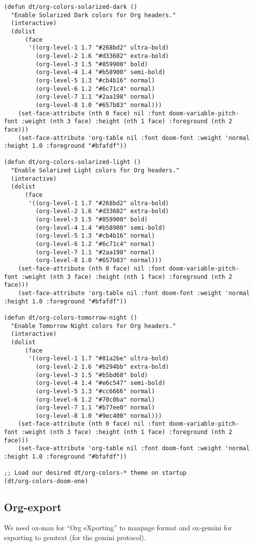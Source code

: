 \documentclass[11pt]{article}
\begin{document}
\begin{verbatim}
(defun dt/org-colors-solarized-dark ()
  "Enable Solarized Dark colors for Org headers."
  (interactive)
  (dolist
      (face
       '((org-level-1 1.7 "#268bd2" ultra-bold)
         (org-level-2 1.6 "#d33682" extra-bold)
         (org-level-3 1.5 "#859900" bold)
         (org-level-4 1.4 "#b58900" semi-bold)
         (org-level-5 1.3 "#cb4b16" normal)
         (org-level-6 1.2 "#6c71c4" normal)
         (org-level-7 1.1 "#2aa198" normal)
         (org-level-8 1.0 "#657b83" normal)))
    (set-face-attribute (nth 0 face) nil :font doom-variable-pitch-font :weight (nth 3 face) :height (nth 1 face) :foreground (nth 2 face)))
    (set-face-attribute 'org-table nil :font doom-font :weight 'normal :height 1.0 :foreground "#bfafdf"))

(defun dt/org-colors-solarized-light ()
  "Enable Solarized Light colors for Org headers."
  (interactive)
  (dolist
      (face
       '((org-level-1 1.7 "#268bd2" ultra-bold)
         (org-level-2 1.6 "#d33682" extra-bold)
         (org-level-3 1.5 "#859900" bold)
         (org-level-4 1.4 "#b58900" semi-bold)
         (org-level-5 1.3 "#cb4b16" normal)
         (org-level-6 1.2 "#6c71c4" normal)
         (org-level-7 1.1 "#2aa198" normal)
         (org-level-8 1.0 "#657b83" normal)))
    (set-face-attribute (nth 0 face) nil :font doom-variable-pitch-font :weight (nth 3 face) :height (nth 1 face) :foreground (nth 2 face)))
    (set-face-attribute 'org-table nil :font doom-font :weight 'normal :height 1.0 :foreground "#bfafdf"))

(defun dt/org-colors-tomorrow-night ()
  "Enable Tomorrow Night colors for Org headers."
  (interactive)
  (dolist
      (face
       '((org-level-1 1.7 "#81a2be" ultra-bold)
         (org-level-2 1.6 "#b294bb" extra-bold)
         (org-level-3 1.5 "#b5bd68" bold)
         (org-level-4 1.4 "#e6c547" semi-bold)
         (org-level-5 1.3 "#cc6666" normal)
         (org-level-6 1.2 "#70c0ba" normal)
         (org-level-7 1.1 "#b77ee0" normal)
         (org-level-8 1.0 "#9ec400" normal)))
    (set-face-attribute (nth 0 face) nil :font doom-variable-pitch-font :weight (nth 3 face) :height (nth 1 face) :foreground (nth 2 face)))
    (set-face-attribute 'org-table nil :font doom-font :weight 'normal :height 1.0 :foreground "#bfafdf"))

;; Load our desired dt/org-colors-* theme on startup
(dt/org-colors-doom-one)

\end{verbatim}

\subsection{Org-export}
\label{sec:org5b8e2a6}
We need ox-man for ``Org eXporting'' to manpage format and ox-gemini for exporting to gemtext (for the gemini protocol).
\end{document}
